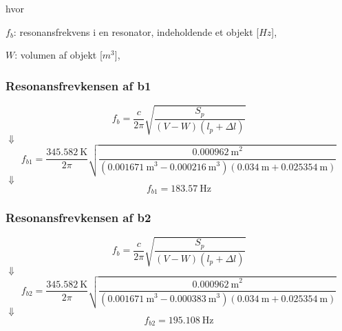 hvor 
\begin{description}[align=left,labelindent=0.3cm]
\item $f_{b}$: resonansfrekvens i en resonator, indeholdende et objekt [$Hz$],\\
\item $W$: volumen af objekt [$m^3$],\\
\end{description}


\subsubsection{Resonansfrevkensen af b1} 
\hspace{1,5cm}
\begin{equation}
		f_{b} = \frac{c}{2\pi}\sqrt{\frac{S_{p}}{(V-W)(l_{p}+\Delta l)}}
	\end{equation}
$\Downarrow$
\begin{equation}
		f_{b1} = \frac{{\SI{345,582}{\kelvin}}}{2\pi}\sqrt{\frac{{\SI{0,000962}{\meter}^2}}{({\SI{0,001671}{\meter}^3}-{\SI{0,000216}{\meter}^3})({\SI{0,034}{\meter}}+ {\SI{0.025354}{\meter}})}}	
\end{equation}
$\Downarrow$
\begin{equation}
		f_{b1} = {\SI{183,57}{\hertz}}
\end{equation}

\subsubsection{Resonansfrevkensen af b2} 
\hspace{1,5cm}
\begin{equation}
		f_{b} = \frac{c}{2\pi}\sqrt{\frac{S_{p}}{(V-W)(l_{p}+\Delta l)}}
	\end{equation}
$\Downarrow$
\begin{equation}
		f_{b2} = \frac{{\SI{345,582}{\kelvin}}}{2\pi}\sqrt{\frac{{\SI{0,000962}{\meter}^2}}{({\SI{0,001671}{\meter}^3}-{\SI{0,000383}{\meter}^3})({\SI{0,034}{\meter}}+ {\SI{0.025354}{\meter}})}}	
\end{equation}
$\Downarrow$
\begin{equation}
		f_{b2} = {\SI{195,108}{\hertz}}
\end{equation}

